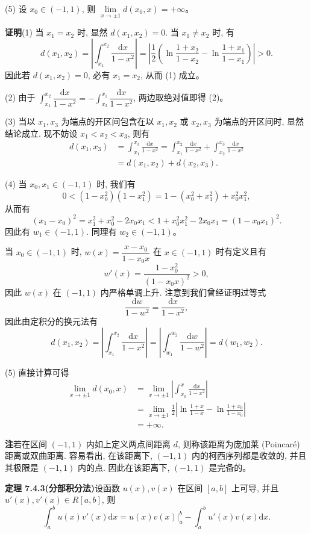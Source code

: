 \documentclass[UTF8,12pt,a4paper,fontset=fandol]{ctexart}
\begin{document}
(5) 设 $x_0\in(-1,1)$, 则 $\lim\limits_{x\to\pm1}d(x_0,x)=+\infty$。

\noindent\textbf{证明}\quad (1) 当 $x_1=x_2$ 时, 显然 $d(x_1,x_2)=0$. 当 $x_1\neq x_2$ 时, 有
\[
  d(x_1,x_2)
  =\left|\int_{x_1}^{x_2}\frac{\mathrm dx}{1-x^2}\right|
  =\left|\frac{1}{2}\left(\ln\frac{1+x_2}{1-x_2}-\ln\frac{1+x_1}{1-x_1}\right)\right|>0.
\]
因此若 $d(x_1,x_2)=0$, 必有 $x_1=x_2$, 从而 (1) 成立。

(2) 由于 $\int_{x_1}^{x_2}\dfrac{\mathrm dx}{1-x^2}=-\int_{x_2}^{x_1}\dfrac{\mathrm dx}{1-x^2}$, 两边取绝对值即得 (2)。

(3) 当以 $x_1,x_3$ 为端点的开区间包含在以 $x_1,x_2$ 或 $x_2,x_3$ 为端点的开区间时, 显然结论成立. 现不妨设 $x_1<x_2<x_3$, 则有
\[
\begin{aligned}
  d(x_1,x_3)
  &=\int_{x_1}^{x_3}\frac{\mathrm dx}{1-x^2}
  =\int_{x_1}^{x_2}\frac{\mathrm dx}{1-x^2}
  +\int_{x_2}^{x_3}\frac{\mathrm dx}{1-x^2}\\
  &=d(x_1,x_2)+d(x_2,x_3).
\end{aligned}
\]

(4) 当 $x_0,x_1\in(-1,1)$ 时, 我们有
\[
  0<(1-x_0^2)(1-x_1^2)=1-(x_0^2+x_1^2)+x_0^2x_1^2,
\]
从而有
\[
  (x_1-x_0)^2=x_1^2+x_0^2-2x_0x_1<1+x_0^2x_1^2-2x_0x_1=(1-x_0x_1)^2.
\]
因此有 $w_1\in(-1,1)$. 同理有 $w_2\in(-1,1)$。

当 $x_0\in(-1,1)$ 时, $w(x)=\dfrac{x-x_0}{1-x_0x}$ 在 $x\in(-1,1)$ 时有定义且有
\[
  w'(x)=\frac{1-x_0^2}{(1-x_0x)^2}>0,
\]
因此 $w(x)$ 在 $(-1,1)$ 内严格单调上升. 注意到我们曾经证明过等式
\[
  \frac{\mathrm dw}{1-w^2}=\frac{\mathrm dx}{1-x^2},
\]
因此由定积分的换元法有
\[
  d(x_1,x_2)=\left|\int_{x_1}^{x_2}\frac{\mathrm dx}{1-x^2}\right|
  =\left|\int_{w_1}^{w_2}\frac{\mathrm dw}{1-w^2}\right|
  =d(w_1,w_2).
\]

(5) 直接计算可得
\[
\begin{aligned}
  \lim_{x\to\pm1}d(x_0,x)
  &=\lim_{x\to\pm1}\left|\int_{x_0}^x\frac{\mathrm dx}{1-x^2}\right|\\
  &=\lim_{x\to\pm1}\frac{1}{2}
  \left|\ln\frac{1+x}{1-x}-\ln\frac{1+x_0}{1-x_0}\right|\\
  &=+\infty.
\end{aligned}
\]

\noindent\textbf{注}\quad 若在区间 $(-1,1)$ 内如上定义两点间距离 $d$, 则称该距离为庞加莱 (Poincaré) 距离或双曲距离. 容易看出, 在该距离下, $(-1,1)$ 内的柯西序列都是收敛的, 并且其极限是 $(-1,1)$ 内的点. 因此在该距离下, $(-1,1)$ 是完备的。

\noindent\textbf{定理 7.4.3(分部积分法)}\quad 设函数 $u(x),v(x)$ 在区间 $[a,b]$ 上可导, 并且 $u'(x),v'(x)\in R[a,b]$, 则
\[
  \int_a^b u(x)v'(x)\mathrm dx
  =\left.u(x)v(x)\right|_a^b-\int_a^b u'(x)v(x)\mathrm dx.
\]
\end{document}
